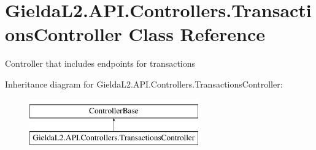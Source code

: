 \hypertarget{class_gielda_l2_1_1_a_p_i_1_1_controllers_1_1_transactions_controller}{}\section{Gielda\+L2.\+A\+P\+I.\+Controllers.\+Transactions\+Controller Class Reference}
\label{class_gielda_l2_1_1_a_p_i_1_1_controllers_1_1_transactions_controller}


Controller that includes endpoints for transactions  


Inheritance diagram for Gielda\+L2.\+A\+P\+I.\+Controllers.\+Transactions\+Controller\+:\begin{figure}[H]
\begin{center}
\leavevmode
\includegraphics[height=2.000000cm]{class_gielda_l2_1_1_a_p_i_1_1_controllers_1_1_transactions_controller}
\end{center}
\end{figure}
